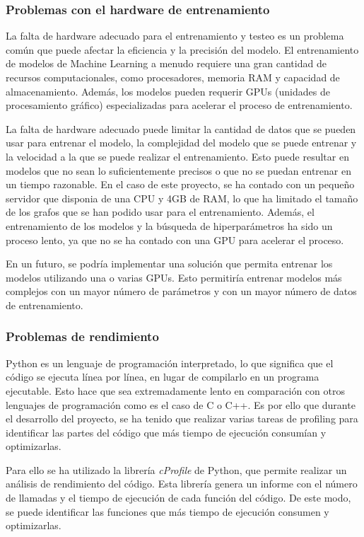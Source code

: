 \subsubsection{Problemas con el hardware de entrenamiento}
La falta de hardware adecuado para el entrenamiento y testeo es un problema común 
que puede afectar la eficiencia y la precisión del modelo. El entrenamiento de modelos 
de Machine Learning a menudo requiere una gran cantidad de recursos computacionales, 
como procesadores, memoria RAM y capacidad de almacenamiento. Además, los modelos 
pueden requerir GPUs (unidades de procesamiento gráfico) especializadas para acelerar 
el proceso de entrenamiento.\medskip

La falta de hardware adecuado puede limitar la cantidad de datos que se pueden usar 
para entrenar el modelo, la complejidad del modelo que se puede entrenar y la 
velocidad a la que se puede realizar el entrenamiento. Esto puede resultar en 
modelos que no sean lo suficientemente precisos o que no se puedan entrenar en 
un tiempo razonable. En el caso de este proyecto, se ha contado con un pequeño
servidor que disponia de una CPU y 4GB de RAM, lo que ha limitado el tamaño de los
grafos que se han podido usar para el entrenamiento. Además, el entrenamiento de
los modelos y la búsqueda de hiperparámetros ha sido un proceso lento, ya que
no se ha contado con una GPU para acelerar el proceso.\medskip

En un futuro, se podría implementar una solución que permita entrenar los modelos
utilizando una o varias GPUs. Esto permitiría entrenar modelos más complejos
con un mayor número de parámetros y con un mayor número de datos de entrenamiento.

\subsubsection{Problemas de rendimiento}
Python es un lenguaje de programación interpretado, lo que significa que el código
se ejecuta línea por línea, en lugar de compilarlo en un programa ejecutable. Esto
hace que sea extremadamente lento en comparación con otros lenguajes de programación
como es el caso de C o C++. Es por ello que durante el desarrollo del proyecto, se
ha tenido que realizar varias tareas de profiling para identificar las partes del
código que más tiempo de ejecución consumían y optimizarlas.\medskip

Para ello se ha utilizado la librería \textit{cProfile} de Python, que permite
realizar un análisis de rendimiento del código. Esta librería genera un informe
con el número de llamadas y el tiempo de ejecución de cada función del código.
De este modo, se puede identificar las funciones que más tiempo de ejecución
consumen y optimizarlas.\medskip

